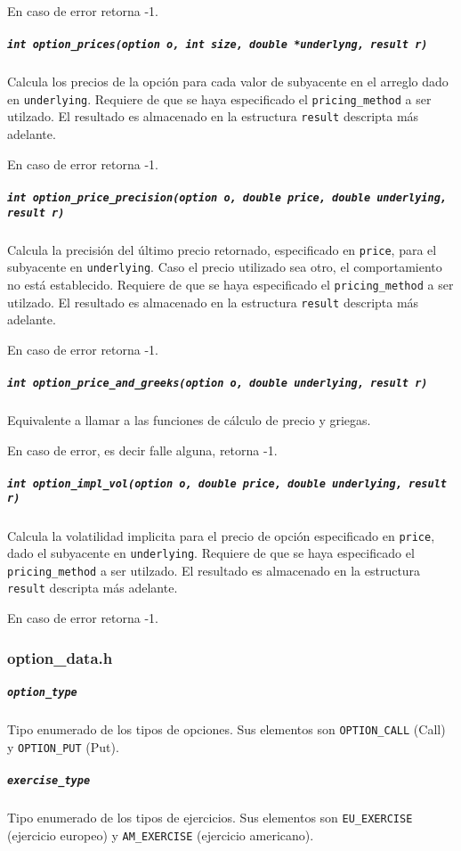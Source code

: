 \documentclass[12pt,a4paper,final]{article}
\begin{document}
				En caso de error retorna -1.

			\subparagraph{\texttt{int option\_prices(option o, int size, double *underlyng, result r)}}
				Calcula los precios de la opción para cada valor de subyacente en el arreglo dado en
				\texttt{underlying}.
				Requiere de que se haya especificado el \texttt{pricing\_method} a ser utilzado.
				El resultado es almacenado en la estructura \texttt{result} descripta más adelante.

				En caso de error retorna -1.

			\subparagraph{\texttt{int option\_price\_precision(option o, double price, double underlying, result r)}}
				Calcula la precisión del último precio retornado, especificado en \texttt{price}, para
				el subyacente en \texttt{underlying}. Caso el precio utilizado sea otro, el comportamiento
				no está establecido.
				Requiere de que se haya especificado el \texttt{pricing\_method} a ser utilzado.
				El resultado es almacenado en la estructura \texttt{result} descripta más adelante.

				En caso de error retorna -1.

			\subparagraph{\texttt{int option\_price\_and\_greeks(option o, double underlying, result r)}}
				Equivalente a llamar a las funciones de cálculo de precio y griegas.

				En caso de error, es decir falle alguna, retorna -1.

			\subparagraph{\texttt{int option\_impl\_vol(option o, double price, double underlying, result r)}}
				Calcula la volatilidad implicita para el precio de opción especificado en \texttt{price}, dado
				el subyacente en \texttt{underlying}.
				Requiere de que se haya especificado el \texttt{pricing\_method} a ser utilzado.
				El resultado es almacenado en la estructura \texttt{result} descripta más adelante.

				En caso de error retorna -1.


		\subsubsection{option\_data.h}

			\subparagraph{\texttt{option\_type}}
				Tipo enumerado de los tipos de opciones. Sus elementos son \texttt{OPTION\_CALL} (Call) y
				\texttt{OPTION\_PUT} (Put).

			\subparagraph{\texttt{exercise\_type}}
				Tipo enumerado de los tipos de ejercicios. Sus elementos son
				\texttt{EU\_EXERCISE} (ejercicio europeo) y \texttt{AM\_EXERCISE} (ejercicio americano).
\end{document}
